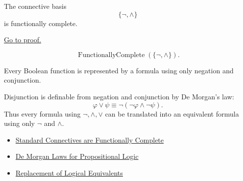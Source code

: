 \begin{tcolorbox}[colback=thmbox, colframe=thmborder, arc=2pt,
  left=6pt, right=6pt, top=4pt, bottom=4pt,
  title={\small\textbf{Theorem (Negation and Conjunction are Functionally Complete)}},
  fonttitle=\small\bfseries]
\begin{theorem}
\label{thm:negation-conjunction-functionally-complete-propositional-logic}
The connective basis
\[
\{\neg,\land\}
\]
is functionally complete.

\noindent\hyperref[prf:negation-conjunction-functionally-complete-propositional-logic]{Go to proof.}
\end{theorem}
\end{tcolorbox}

\begin{remark*}
\[
\operatorname{FunctionallyComplete}(\{\neg,\land\}).
\]
\end{remark*}

\begin{remark*}
Every Boolean function is represented by a formula using only negation and
conjunction.
\end{remark*}

\begin{remark*}[Interpretation]
Disjunction is definable from negation and conjunction by De Morgan's law:
\[
\varphi\lor\psi\equiv\neg(\neg\varphi\land\neg\psi).
\]
Thus every formula using \(\neg,\land,\lor\) can be translated into an equivalent
formula using only \(\neg\) and \(\land\).
\end{remark*}

\begin{dependencies}
\begin{itemize}
  \item \hyperref[thm:standard-connectives-functionally-complete-propositional-logic]{Standard Connectives are Functionally Complete}
  \item \hyperref[thm:de-morgan-laws-propositional-logic]{De Morgan Laws for Propositional Logic}
  \item \hyperref[thm:replacement-of-logical-equivalents-propositional-logic]{Replacement of Logical Equivalents}
\end{itemize}
\end{dependencies}

